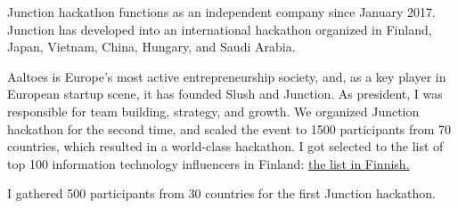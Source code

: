 \documentclass[]{deedy-resume}
\begin{document}
\begin{minipage}[t]{0.66\textwidth}
% 


Junction hackathon functions as an independent company since January 2017. Junction has developed into an international hackathon organized in Finland, Japan, Vietnam, China, Hungary, and Saudi Arabia.
\sectionsep

Aaltoes is Europe's most active entrepreneurship society, and, as a key player in European startup scene, it has founded Slush and Junction.
As president, I was responsible for team building, strategy, and growth. We organized Junction hackathon for the second time, and scaled the event to 1500 participants from 70 countries, which resulted in a world-class hackathon. I got selected to the list of top 100 information technology influencers in Finland: \href{https://www.tivi.fi/Kaikki_uutiset/tassa-ovat-it-alan-100-vaikuttajaa-2016-6604873}{\underline{the list in Finnish}.}
\sectionsep

I gathered 500 participants from 30 countries for the first Junction hackathon.
\sectionsep


\end{minipage}
\end{document}
